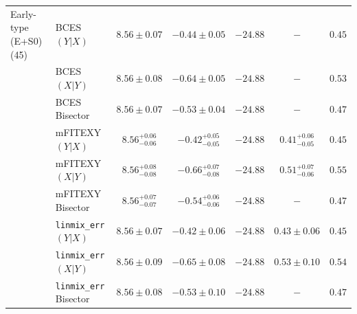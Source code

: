 \documentclass[preprint2]{emulateapj}
\begin{document}
\begin{table}
\begin{tabular}{llccccc}
 Early-type (E+S0) (45) & BCES $(Y|X)$   & $8.56 \pm 0.07$ & $-0.44 \pm 0.05$ & $-24.88$ & $-$ & $0.45$ \\
                        & BCES $(X|Y)$   & $8.56 \pm 0.08$ & $-0.64 \pm 0.05$ & $-24.88$ & $-$ & $0.53$ \\
                        & BCES Bisector  & $8.56 \pm 0.07$ & $-0.53 \pm 0.04$ & $-24.88$ & $-$ & $0.47$ \\
                        & mFITEXY $(Y|X)$  & $8.56^{+0.06}_{-0.06}$ & $-0.42^{+0.05}_{-0.05}$ & $-24.88$ & $0.41^{+0.06}_{-0.05}$ & $0.45$ \\
                        & mFITEXY $(X|Y)$  & $8.56^{+0.08}_{-0.08}$ & $-0.66^{+0.07}_{-0.08}$ & $-24.88$ & $0.51^{+0.07}_{-0.06}$ & $0.55$ \\
                        & mFITEXY Bisector & $8.56^{+0.07}_{-0.07}$ & $-0.54^{+0.06}_{-0.06}$ & $-24.88$ & $-$    & $0.47$ \\
                        & {\tt linmix\_err} $(Y|X)$  & $8.56 \pm 0.07$ & $-0.42 \pm 0.06$ & $-24.88$ & $0.43 \pm 0.06$ & $0.45$ \\
                        & {\tt linmix\_err} $(X|Y)$  & $8.56 \pm 0.09$ & $-0.65 \pm 0.08$ & $-24.88$ & $0.53 \pm 0.10$ & $0.54$ \\
                        & {\tt linmix\_err} Bisector & $8.56 \pm 0.08$ & $-0.53 \pm 0.10$ & $-24.88$ & $-$    & $0.47$ \\



\end{tabular}
\end{table}
\end{document}
